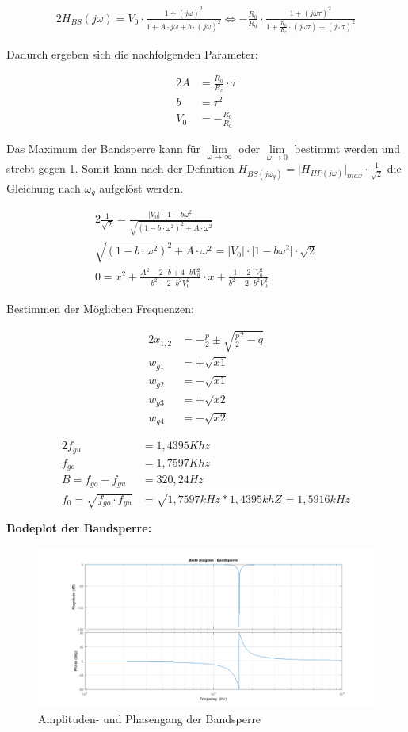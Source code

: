 \begin{alignat}{2}
H_{BS}(j\omega) = V_{0} \cdot \frac{1 + (j\omega)^2}{1 + A \cdot j \omega + b \cdot (j\omega)^2} \Longleftrightarrow - \frac{R_{0}}{R_{a}} \cdot \frac{1 + (j\omega \tau)^2}{1 + \frac{R_{0}}{R_{c}} \cdot (j\omega \tau) + (j\omega \tau)^2}
\end{alignat}

\noindent Dadurch ergeben sich die nachfolgenden Parameter:

\begin{alignat}{2}
A &= \frac{R_{0}}{R_{c}} \cdot \tau\\
b &= \tau^2\\
V_{0} &= - \frac{R_{0}}{R_{a}}
\end{alignat}

\noindent Das Maximum der Bandsperre kann für $\lim\limits_{\omega \to \infty}$ oder $\lim\limits_{\omega \to 0}$ bestimmt werden und strebt gegen 1. Somit kann nach der Definition $H_{BS (j \omega_{g})} = \lvert H_{HP (j \omega)} \rvert_{max} \cdot \frac{1}{\sqrt{2}}$  die Gleichung nach $\omega_{g}$ aufgelöst werden.

\begin{alignat}{2}
\frac{1}{\sqrt{2}} = \frac{\lvert V_{0} \rvert \cdot \lvert 1- b \omega^2 \rvert}{\sqrt{(1- b \cdot \omega^2)^2 + A \cdot \omega^2}}\\
\sqrt{(1- b \cdot \omega^2)^2 + A \cdot \omega^2} = \lvert V_{0} \rvert \cdot \lvert 1- b \omega^2 \rvert \cdot \sqrt{2}\\
0 = x^2 + \frac{A^2 - 2 \cdot b + 4 \cdot b V_{0}^2}{b^2 - 2 \cdot b^2 V_{0}^2} \cdot x + \frac{1-2\cdot V_{0}^2}{b^2 - 2 \cdot b^2 V_{0}^2}
\end{alignat}

\noindent Bestimmen der Möglichen Frequenzen:

\begin{alignat}{2}
x_{1,2} &= -\frac{p}{2} \pm \sqrt{\frac{p}{2}^2 - q}\\
w_{g1} &= +\sqrt{x1}\\
w_{g2} &= -\sqrt{x1}\\
w_{g3} &= +\sqrt{x2}\\
w_{g4} &= -\sqrt{x2}
\end{alignat}

\begin{alignat}{2}
f_{gu} &= 1,4395Khz\\
f_{go} &= 1,7597Khz\\
B = f_{go} - f_{gu} &= 320,24Hz\\
f_{0} = \sqrt{f_{go} \cdot f_{gu}} &= \sqrt{1,7597kHz * 1,4395khZ} = 1,5916kHz
\end{alignat}

\textbf{Bodeplot der Bandsperre:}

\begin{figure}[h]
\centering
\includegraphics[width=0.9\linewidth]{Bilder/Bandsperre}
\caption{Amplituden- und Phasengang der Bandsperre}
\label{fig:Bandsperre}
\end{figure}
